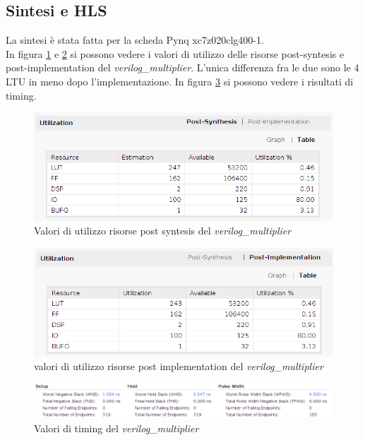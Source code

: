 \documentclass[]{IEEEtran}
\begin{document}
\subsection{Sintesi e HLS}
La sintesi è stata fatta per la scheda Pynq xc7z020clg400-1.
\\In figura \ref{fig:UTIL_SYNT_VERILOG} e \ref{fig:UTIL_IMPL_VERILOG} si possono vedere i valori di utilizzo delle risorse post-syntesis e post-implementation del \textit{verilog\_multiplier}. L'unica differenza fra le due sono le 4 LTU in meno dopo l'implementazione. In figura \ref{fig:TIMING_VERILOG} si possono vedere i risultati di timing.
\begin{figure}[!htb]
    \centering
    \includegraphics[width=0.9\linewidth]{figures/util_synt_verilog}
    \caption{Valori di utilizzo risorse post syntesis del \textit{verilog\_multiplier}}
    \label{fig:UTIL_SYNT_VERILOG}
\end{figure}
\begin{figure}[!htb]
    \centering
    \includegraphics[width=0.9\linewidth]{figures/util_impl_verilog}
    \caption{valori di utilizzo risorse post implementation del \textit{verilog\_multiplier}}
    \label{fig:UTIL_IMPL_VERILOG}
\end{figure}
\begin{figure}[!htb]
    \centering
    \includegraphics[width=0.9\linewidth]{figures/timing_verilog}
    \caption{Valori di timing del \textit{verilog\_multiplier}}
    \label{fig:TIMING_VERILOG}
\end{figure}
\end{document}
